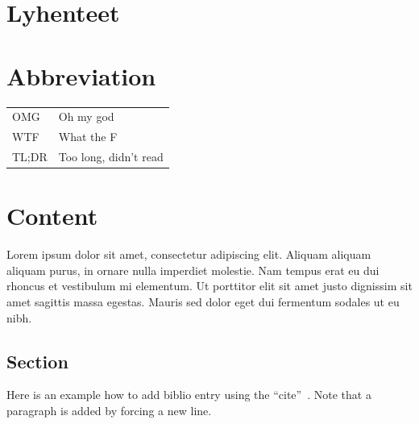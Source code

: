 \documentclass[11pt,a4paper,oneside,article]{memoir}
\begin{document}
\pagestyle{empty}
\setlength{\parskip}{1cm}
 {
  \chapter*{Lyhenteet}
} {
  \chapter*{Abbreviation}
}
\begin{table}[h]
\setlength{\tabcolsep}{8pt}
\renewcommand{\arraystretch}{2}
\begin{tabular}{l p{12cm}}
OMG & Oh my god\\
WTF & What the F\\
TL;DR & Too long, didn't read\\
\end{tabular}
\end{table}

\newpage

\pagestyle{plain}

\setcounter{page}{1} %
\ClearWallPaper

\chapter{Content}
Lorem ipsum dolor sit amet, consectetur adipiscing elit. Aliquam aliquam aliquam purus, in ornare nulla imperdiet molestie. Nam tempus erat eu dui rhoncus et vestibulum mi elementum. Ut porttitor elit sit amet justo dignissim sit amet sagittis massa egestas. Mauris sed dolor eget dui fermentum sodales ut eu nibh. 

\section{Section}
Here is an example how to add biblio entry \cite{kopka:guide} using the \textquotedblleft cite\textquotedblright ~\cite[section 4.2]{tobias:book}. Note that a paragraph is added by forcing a new line.
\end{document}
